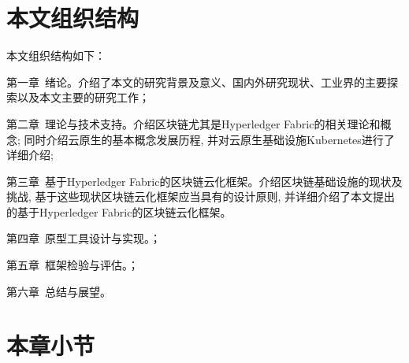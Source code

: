 


\section{本文组织结构}

本文组织结构如下：

第一章~绪论。介绍了本文的研究背景及意义、国内外研究现状、工业界的主要探索以及本文主要的研究工作；

第二章~理论与技术支持。介绍区块链尤其是Hyperledger Fabric的相关理论和概念; 同时介绍云原生的基本概念发展历程, 并对云原生基础设施Kubernetes进行了详细介绍;

第三章~基于Hyperledger Fabric的区块链云化框架。介绍区块链基础设施的现状及挑战, 基于这些现状区块链云化框架应当具有的设计原则, 并详细介绍了本文提出的基于Hyperledger Fabric的区块链云化框架。

第四章~原型工具设计与实现。；

第五章~框架检验与评估。；

第六章~总结与展望。

\section{本章小节}
